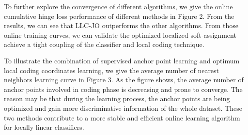 \documentclass{llncs}
\begin{document}
	To further explore the convergence of different algorithms, we give the online cumulative hinge loss performance of different methods in Figure 2. From the results, we can see that LLC-JO outperforms the other algorithms. From those online training curves, we can validate the optimized localized soft-assignment achieve a tight coupling of the classifier and local coding technique.
	

	To illustrate the combination of supervised anchor point learning and optimum local coding coordinates learning, we give the average number of nearest neighbors learning curve in Figure 3. As the figure shows, the average number of anchor points involved in coding phase is decreasing and prone to converge. The reason may be that during the learning process, the anchor points are being optimized and gain more discriminative information of the whole dataset. These two methods contribute to a more stable and efficient online learning algorithm for locally linear classifiers.
\end{document}
